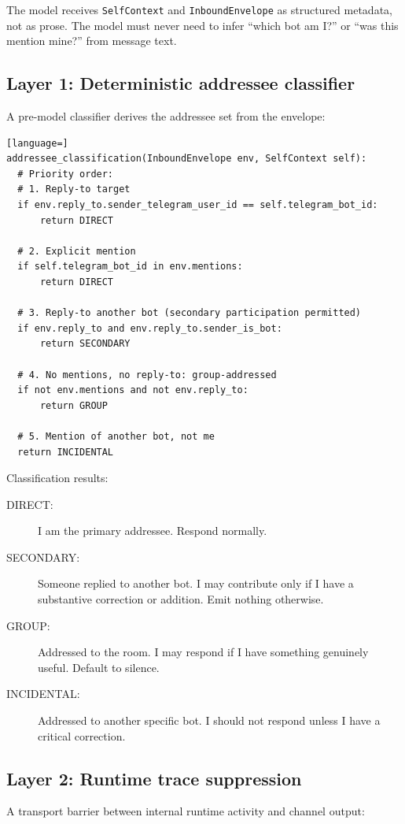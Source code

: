 \documentclass[11pt]{article}
\begin{document}
The model receives \texttt{SelfContext} and \texttt{InboundEnvelope} as
structured metadata, not as prose.  The model must never need to infer ``which
bot am I?'' or ``was this mention mine?'' from message text.

\subsection{Layer 1: Deterministic addressee classifier}

A pre-model classifier derives the addressee set from the envelope:

\begin{lstlisting}[language=]
addressee_classification(InboundEnvelope env, SelfContext self):
  # Priority order:
  # 1. Reply-to target
  if env.reply_to.sender_telegram_user_id == self.telegram_bot_id:
      return DIRECT

  # 2. Explicit mention
  if self.telegram_bot_id in env.mentions:
      return DIRECT

  # 3. Reply-to another bot (secondary participation permitted)
  if env.reply_to and env.reply_to.sender_is_bot:
      return SECONDARY

  # 4. No mentions, no reply-to: group-addressed
  if not env.mentions and not env.reply_to:
      return GROUP

  # 5. Mention of another bot, not me
  return INCIDENTAL
\end{lstlisting}

Classification results:
\begin{description}
\item[DIRECT:] I am the primary addressee.  Respond normally.
\item[SECONDARY:] Someone replied to another bot.  I may contribute only if I
have a substantive correction or addition.  Emit nothing otherwise.
\item[GROUP:] Addressed to the room.  I may respond if I have something
genuinely useful.  Default to silence.
\item[INCIDENTAL:] Addressed to another specific bot.  I should not respond
unless I have a critical correction.
\end{description}

\subsection{Layer 2: Runtime trace suppression}

A transport barrier between internal runtime activity and channel output:
\end{document}

